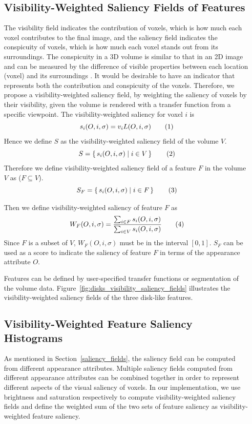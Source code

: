 \subsection{Visibility-Weighted Saliency Fields of Features \label{visibility_weighted_saliency}}
The visibility field indicates the contribution of voxels, which is how much each voxel contributes to the final image, and the saliency field indicates the conspicuity of voxels, which is how much each voxel stands out from its surroundings.
The conspicuity in a 3D volume is similar to that in an 2D image and can be measured by the difference of visible properties between each location (voxel) and its surroundings \cite{duan_visual_2011}.
It would be desirable to have an indicator that represents both the contribution and conspicuity of the voxels.
Therefore, we propose a visibility-weighted saliency field, by weighting the saliency of voxels by their visibility, given the volume is rendered with a transfer function from a specific viewpoint.
The visibility-weighted saliency for voxel $ i $ is
\[ s_{i}(O,i,\sigma)= v_{i} L(O,i,\sigma)
\addtag \]
Hence we define $ S $ as the visibility-weighted saliency field of the volume $ V $.
\[ S=\set{s_{i}(O,i,\sigma)|i \in V} 
\addtag \]
Therefore we define visibility-weighted saliency field of a feature $ F $ in the volume $ V $ as ($ F\subseteq V $).
\[ S_{F}=\set{s_{i}(O,i,\sigma)|i \in F} 
\addtag \]

Then we define visibility-weighted saliency of feature $ F $ as
\[ W_{F}(O,i,\sigma)=\frac{\sum_{i \in F}{s_{i}(O,i,\sigma)}}{\sum_{i \in V}{s_{i}(O,i,\sigma)}} 
\addtag \]
Since $ F $ is a subset of $ V $, $ W_{F}(O,i,\sigma) $ must be in the interval $ [0,1] $.
$ S_{F} $ can be used as a score to indicate the saliency of feature $ F $ in terms of the appearance attribute $ O $.

Features can be defined by user-specified transfer functions or segmentation of the volume data.
Figure~\ref{fig:disks_visibility_saliency_fields} illustrates the visibility-weighted saliency fields of the three disk-like features.

\subsection{Visibility-Weighted Feature Saliency Histograms \label{weighted_feature_saliency}}
As mentioned in Section~\ref{saliency_fields}, the saliency field can be computed from different appearance attributes.
Multiple saliency fields computed from different appearance attributes can be combined together in order to represent different aspects of the visual saliency of voxels.
In our implementation, we use brightness and saturation respectively to compute visibility-weighted saliency fields and define the weighted sum of the two sets of feature saliency as visibility-weighted feature saliency.

